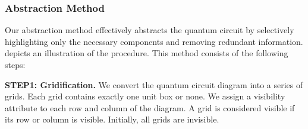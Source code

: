 


\subsubsection{Abstraction Method}
Our abstraction method effectively abstracts the quantum circuit by selectively highlighting only the necessary components and removing redundant information.
{ depicts an illustration of the procedure.}
This method consists of the following steps:

\noindent
\textbf{STEP1: Gridification.}
We convert the quantum circuit diagram into a series of grids.
Each grid contains exactly one unit box or none.
We assign a visibility attribute to each row and column of the diagram.
A grid is considered visible if its row or column is visible.
Initially, all grids are invisible. 

